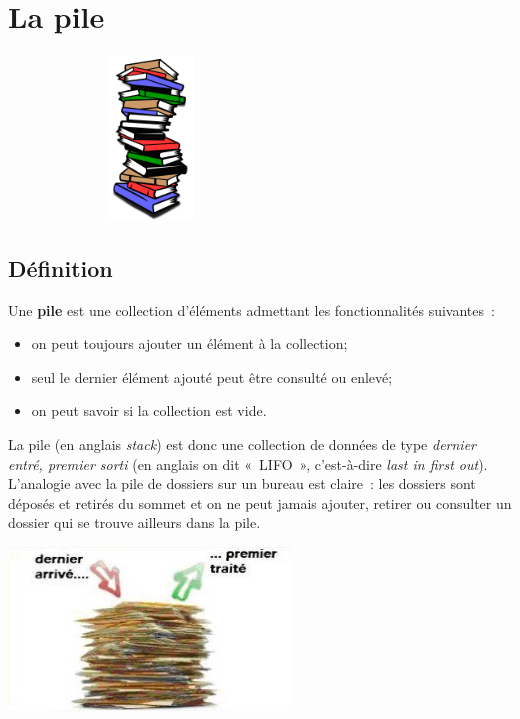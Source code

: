 \chapter{La pile}

\begin{center}
	\includegraphics[width=7.553cm,height=4.357cm]{image/a2012Logique2eme-img011.png}
\end{center}
	

\section{Définition}
	
	Une \textbf{pile} est une collection d'éléments admettant 
	les fonctionnalités suivantes~:

	\begin{itemize}
		\item {
			on peut toujours ajouter un élément à la collection;}
		\item {
			seul le dernier élément ajouté peut être consulté ou enlevé;}
		\item {
			on peut savoir si la collection est vide.}
	\end{itemize}

	La pile (en anglais \textit{stack}) est donc une collection 
	de données de type \textit{dernier entré, premier sorti} (en
	anglais on dit «~LIFO~», c'est-à-dire \textit{last in first out}). 
	L'analogie avec la pile de dossiers sur un bureau
	est claire~: les dossiers sont déposés et retirés du sommet 
	et on ne peut jamais ajouter, retirer ou consulter un dossier 
	qui se trouve ailleurs dans la pile.
	
	\begin{center}
	\includegraphics[width=7.553cm,height=4.357cm]{image/a2012Logique2eme-img012.jpg}
	\end{center}
	
